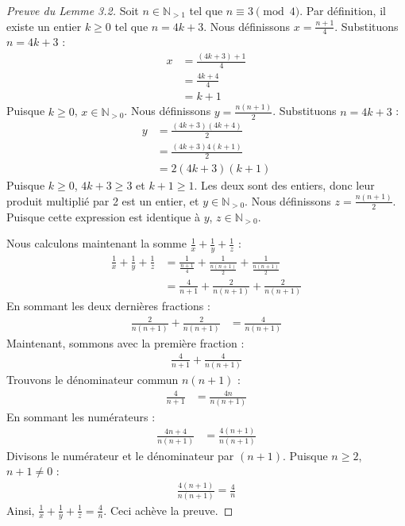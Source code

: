 \documentclass[11pt,a4paper]{article}
\begin{document}
\begin{proof}[Preuve du Lemme 3.2]
Soit $n \in \mathbb{N}_{>1}$ tel que $n \equiv 3 \pmod 4$.
Par d\'efinition, il existe un entier $k \geq 0$ tel que $n = 4k + 3$.
Nous d\'efinissons $x = \frac{n+1}{4}$.
Substituons $n = 4k + 3$ :
\begin{align*}
x &= \frac{(4k+3)+1}{4} \\
  &= \frac{4k+4}{4} \\
  &= k+1
\end{align*}
Puisque $k \geq 0$, $x \in \mathbb{N}_{>0}$.
Nous d\'efinissons $y = \frac{n(n+1)}{2}$.
Substituons $n = 4k + 3$ :
\begin{align*}
y &= \frac{(4k+3)(4k+4)}{2} \\
  &= \frac{(4k+3)4(k+1)}{2} \\
  &= 2(4k+3)(k+1)
\end{align*}
Puisque $k \geq 0$, $4k+3 \geq 3$ et $k+1 \geq 1$. Les deux sont des entiers, donc leur produit multipli\'e par 2 est un entier, et $y \in \mathbb{N}_{>0}$.
Nous d\'efinissons $z = \frac{n(n+1)}{2}$.
Puisque cette expression est identique \`a $y$, $z \in \mathbb{N}_{>0}$.

Nous calculons maintenant la somme $\frac{1}{x} + \frac{1}{y} + \frac{1}{z}$ :
\begin{align*}
\frac{1}{x} + \frac{1}{y} + \frac{1}{z} &= \frac{1}{\frac{n+1}{4}} + \frac{1}{\frac{n(n+1)}{2}} + \frac{1}{\frac{n(n+1)}{2}} \\
&= \frac{4}{n+1} + \frac{2}{n(n+1)} + \frac{2}{n(n+1)}
\end{align*}
En sommant les deux derni\`eres fractions :
\begin{align*}
\frac{2}{n(n+1)} + \frac{2}{n(n+1)} &= \frac{4}{n(n+1)}
\end{align*}
Maintenant, sommons avec la premi\`ere fraction :
\begin{align*}
\frac{4}{n+1} + \frac{4}{n(n+1)}
\end{align*}
Trouvons le d\'enominateur commun $n(n+1)$ :
\begin{align*}
\frac{4}{n+1} &= \frac{4n}{n(n+1)}
\end{align*}
En sommant les num\'erateurs :
\begin{align*}
\frac{4n + 4}{n(n+1)} &= \frac{4(n+1)}{n(n+1)}
\end{align*}
Divisons le num\'erateur et le d\'enominateur par $(n+1)$. Puisque $n \geq 2$, $n+1 \neq 0$ :
\begin{align*}
\frac{4(n+1)}{n(n+1)} = \frac{4}{n}
\end{align*}
Ainsi, $\frac{1}{x} + \frac{1}{y} + \frac{1}{z} = \frac{4}{n}$.
Ceci ach\`eve la preuve.
\end{proof}
\end{document}
